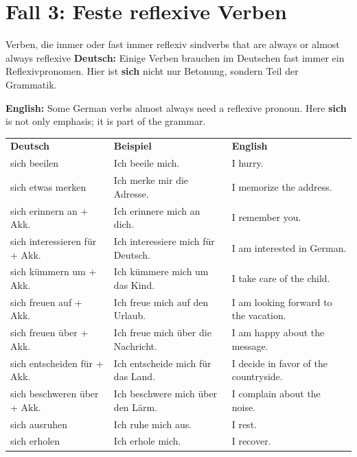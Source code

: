 \documentclass[a4paper,11pt]{article}
\newcommand{\GermanText}[1]{\textbf{Deutsch: }#1\par}
\newcommand{\EnglishText}[1]{{\small\color{SoftGray}\textbf{English: }#1\par}}
\newcommand{\HeaderCell}[1]{\cellcolor{HeaderBlueDark}\color{white}\bfseries #1}
\begin{document}
    
    \section{Fall 3: Feste reflexive Verben}
        
        \begin{grammarentry}{Verben, die immer oder fast immer reflexiv sind}{verbs that are always or almost always reflexive}
            \GermanText{Einige Verben brauchen im Deutschen fast immer ein Reflexivpronomen. Hier ist \textbf{sich} nicht nur Betonung, sondern Teil der Grammatik.}
            \EnglishText{Some German verbs almost always need a reflexive pronoun. Here \textbf{sich} is not only emphasis; it is part of the grammar.}
            
            \begin{longtable}{>{\raggedright\arraybackslash}p{}>{\raggedright\arraybackslash}p{}>{\raggedright\arraybackslash}p{}}
                \HeaderCell{Deutsch} & \HeaderCell{Beispiel} & \HeaderCell{English} \\
                sich beeilen & Ich beeile mich. & I hurry. \\
                sich etwas merken & Ich merke mir die Adresse. & I memorize the address. \\
                sich erinnern an + Akk. & Ich erinnere mich an dich. & I remember you. \\
                sich interessieren für + Akk. & Ich interessiere mich für Deutsch. & I am interested in German. \\
                sich kümmern um + Akk. & Ich kümmere mich um das Kind. & I take care of the child. \\
                sich freuen auf + Akk. & Ich freue mich auf den Urlaub. & I am looking forward to the vacation. \\
                sich freuen über + Akk. & Ich freue mich über die Nachricht. & I am happy about the message. \\
                sich entscheiden für + Akk. & Ich entscheide mich für das Land. & I decide in favor of the countryside. \\
                sich beschweren über + Akk. & Ich beschwere mich über den Lärm. & I complain about the noise. \\
                sich ausruhen & Ich ruhe mich aus. & I rest. \\
                sich erholen & Ich erhole mich. & I recover. \\
            \end{longtable}
        \end{grammarentry}
    
\end{document}
